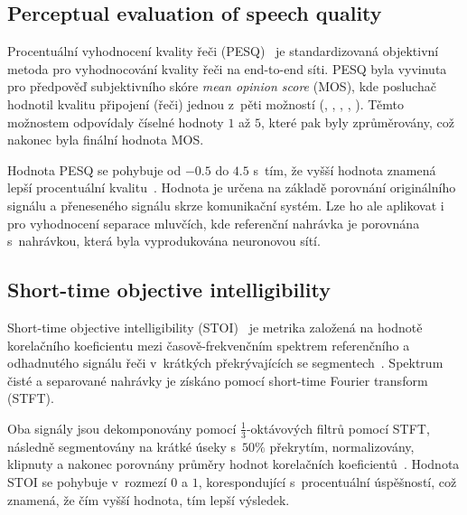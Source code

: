 

\subsection{Perceptual evaluation of speech quality}
Procentuální vyhodnocení kvality řeči (PESQ)~\cite{pesq-itut} je standardizovaná objektivní metoda pro vyhodnocování kvality řeči na end-to-end síti. PESQ byla vyvinuta pro předpověď subjektivního skóre \textit{mean opinion score} (MOS), kde posluchač hodnotil kvalitu připojení (řeči) jednou z~pěti možností (, , , , ). Těmto možnostem odpovídaly číselné hodnoty $1$ až $5$, které pak byly zprůměrovány, což nakonec byla finální hodnota MOS.

Hodnota PESQ se pohybuje od $-0.5$ do $4.5$ s~tím, že vyšší hodnota znamená lepší procentuální kvalitu~\cite{sdr-pesq-optimization}. Hodnota je určena na základě porovnání originálního signálu a přeneseného signálu skrze komunikační systém. Lze ho ale aplikovat i pro vyhodnocení separace mluvčích, kde referenční nahrávka je porovnána s~nahrávkou, která byla vyprodukována neuronovou sítí.





\subsection{Short-time objective intelligibility}
Short-time objective intelligibility (STOI)~\cite{taal-stoi} je metrika založená na hodnotě korelačního koeficientu mezi časově-frekvenčním spektrem referenčního a odhadnutého signálu řeči v~krátkých překrývajících se segmentech~\cite{5713237}. Spektrum čisté a separované nahrávky je získáno pomocí short-time Fourier transform (STFT).

Oba signály jsou dekomponovány pomocí $\frac{1}{3}$-oktávových filtrů pomocí STFT, následně segmentovány na krátké úseky s~$50\%$ překrytím, normalizovány, klipnuty a nakonec porovnány průměry hodnot korelačních koeficientů~\cite{taal-stoi}. Hodnota STOI se pohybuje v~rozmezí $0$ a $1$, korespondující s~procentuální úspěšností, což znamená, že čím vyšší hodnota, tím lepší výsledek.

